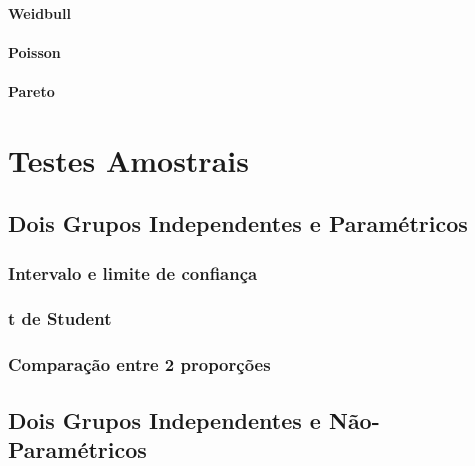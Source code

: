 \documentclass[
]{book}
\begin{document}
\hypertarget{weidbull}{%
\subsection{Weidbull}\label{weidbull}}

\hypertarget{poisson}{%
\subsection{Poisson}\label{poisson}}

\hypertarget{pareto}{%
\subsection{Pareto}\label{pareto}}

\hypertarget{part-testes-amostrais}{%
\part{Testes Amostrais}\label{part-testes-amostrais}}

\hypertarget{dois-grupos-independentes-e-paramuxe9tricos}{%
\chapter{Dois Grupos Independentes e Paramétricos}\label{dois-grupos-independentes-e-paramuxe9tricos}}

\hypertarget{intervalo-e-limite-de-confianuxe7a}{%
\section{Intervalo e limite de confiança}\label{intervalo-e-limite-de-confianuxe7a}}

\hypertarget{t-de-student-1}{%
\section{t de Student}\label{t-de-student-1}}

\hypertarget{comparauxe7uxe3o-entre-2-proporuxe7uxf5es}{%
\section{Comparação entre 2 proporções}\label{comparauxe7uxe3o-entre-2-proporuxe7uxf5es}}

\hypertarget{dois-grupos-independentes-e-nuxe3o-paramuxe9tricos}{%
\chapter{Dois Grupos Independentes e Não-Paramétricos}\label{dois-grupos-independentes-e-nuxe3o-paramuxe9tricos}}
\end{document}
